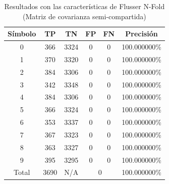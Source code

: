 \documentclass[a4paper, 11pt, oneside]{report}
\begin{document}
\begin{table}
\centering
\begin{tabular}{|c|c|c|c|c|c|}
\hline
Símbolo & TP & TN & FP & FN & Precisión \\ 
\hline
0 & 366 & 3324 & 0 & 0 & 100.000000\% \\ 
1 & 370 & 3320 & 0 & 0 & 100.000000\% \\ 
2 & 384 & 3306 & 0 & 0 & 100.000000\% \\ 
3 & 342 & 3348 & 0 & 0 & 100.000000\% \\ 
4 & 384 & 3306 & 0 & 0 & 100.000000\% \\ 
5 & 366 & 3324 & 0 & 0 & 100.000000\% \\ 
6 & 353 & 3337 & 0 & 0 & 100.000000\% \\ 
7 & 367 & 3323 & 0 & 0 & 100.000000\% \\ 
8 & 363 & 3327 & 0 & 0 & 100.000000\% \\ 
9 & 395 & 3295 & 0 & 0 & 100.000000\% \\ 
\hline
Total & 3690 & N/A & \multicolumn{2}{|c|}{0} & 100.000000\% \\
\hline
\end{tabular}
\caption{Resultados con las características de Flusser N-Fold (Matriz de covarianza semi-compartida)}
\label{tb:numRotShared}
\end{table}
\end{document}
